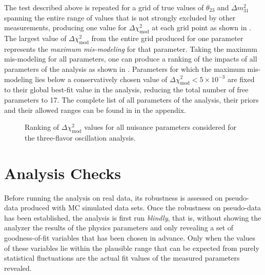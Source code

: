 The test described above is repeated for a grid of true values of $\theta_{23}$ and $\Delta m^2_{31}$ spanning the entire range of values that is not strongly excluded by other measurements, producing one value for $\Delta \chi^2_{\mathrm{mod}}$ at each grid point as shown in . The largest value of $\Delta \chi^2_{\mathrm{mod}}$ from the entire grid produced for one parameter represents the \emph{maximum mis-modeling} for that parameter. Taking the maximum mis-modeling for all parameters, one can produce a ranking of the impacts of all parameters of the analysis as shown in . Parameters for which the maximum mis-modeling lies below a conservatively chosen value of $\Delta \chi^2_{\mathrm{mod}} < 5\times10^{-3}$ are fixed to their global best-fit value in the analysis, reducing the total number of free parameters to 17. The complete list of all parameters of the analysis, their priors and their allowed ranges can be found in  in the appendix.
\begin{figure}
    \centering
    
    \caption{Ranking of $\Delta \chi^2_{\mathrm{mod}}$ values for all nuisance parameters considered for the three-flavor oscillation analysis.}
    \label{fig:systematic-impact-mismod-ranking}
\end{figure}

\section{Analysis Checks}
Before running the analysis on real data, its robustness is assessed on pseudo-data produced with MC simulated data sets. Once the robustness on pseudo-data has been established, the analysis is first run \emph{blindly}, that is, without showing the analyzer the results of the physics parameters and only revealing a set of goodness-of-fit variables that has been chosen in advance. Only when the values of these variables lie within the plausible range that can be expected from purely statistical fluctuations are the actual fit values of the measured parameters revealed. 

